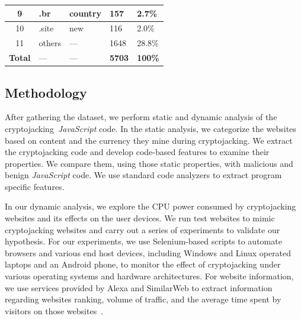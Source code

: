 \documentclass[acmlarge]{acmart}
\newcommand{\js}{{\em JavaScript}\xspace}
\newcommand{\cj}{cryptojacking\xspace}
\begin{document}
\begin{table}[t]
\begin{tabular}{|c|l|l|l|l|}
9 & .br                                                    & country                                                   &157                                         & 2.7\%                                       \\ \hline

10 & .site                                                  & new                                                   &116                                         & 2.0\%                                       \\ \hline

11 & others                                                 & {---}                                                                                                & 1648                                        & 28.8\%                                      \\ \hline \hline

\textbf{Total}  &   {---}                                              & {---}  & \textbf{5703}                                        & \textbf{100\%}                                      \\ \hline
\end{tabular}
\end{table}

\subsection{Methodology} \label{sec:method}
After gathering the dataset, we perform static and dynamic analysis of the \cj~\js code. In the static analysis, we categorize the websites based on content and the currency they mine during \cj. We extract the \cj code and develop code-based features to examine their properties. We compare them, using those static properties, with malicious and benign \js code. We use standard code analyzers to extract program specific features. 

In our dynamic analysis, we explore the CPU power consumed by \cj websites and its effects on the user devices. We run test websites to mimic \cj websites and carry out a series of experiments to validate our hypothesis. For our experiments, we use Selenium-based scripts to automate browsers and various end host devices, including Windows and Linux operated laptops and an Android phone, to monitor the effect of \cj under various operating systems and hardware architectures.  For website information, we use services provided by Alexa and SimilarWeb to extract information regarding websites ranking, volume of traffic, and the average time spent by visitors on those websites~\cite{Similarweb-18}. 
\end{document}
